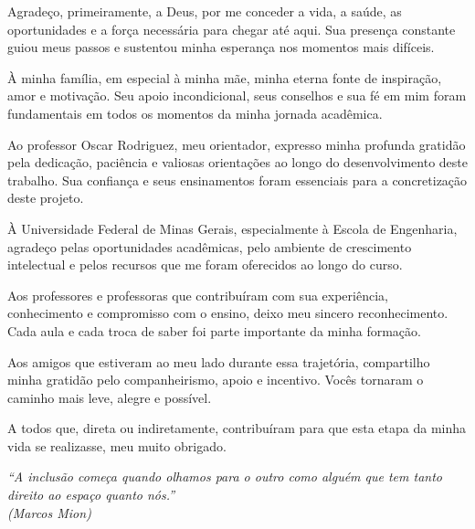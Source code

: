 \documentclass[
	12pt,				%
	openright,			%
	oneside,			%
	a4paper,			%
	english,			%
	french,				%
	spanish,			%
	brazil,				%
	]{abntex2}
\begin{document}
\begin{agradecimentos}
Agradeço, primeiramente, a Deus, por me conceder a vida, a saúde, as oportunidades e a força necessária para chegar até aqui. Sua presença constante guiou meus passos e sustentou minha esperança nos momentos mais difíceis.

À minha família, em especial à minha mãe, minha eterna fonte de inspiração, amor e motivação. Seu apoio incondicional, seus conselhos e sua fé em mim foram fundamentais em todos os momentos da minha jornada acadêmica.

Ao professor Oscar Rodriguez, meu orientador, expresso minha profunda gratidão pela dedicação, paciência e valiosas orientações ao longo do desenvolvimento deste trabalho. Sua confiança e seus ensinamentos foram essenciais para a concretização deste projeto.

À Universidade Federal de Minas Gerais, especialmente à Escola de Engenharia, agradeço pelas oportunidades acadêmicas, pelo ambiente de crescimento intelectual e pelos recursos que me foram oferecidos ao longo do curso.

Aos professores e professoras que contribuíram com sua experiência, conhecimento e compromisso com o ensino, deixo meu sincero reconhecimento. Cada aula e cada troca de saber foi parte importante da minha formação.

Aos amigos que estiveram ao meu lado durante essa trajetória, compartilho minha gratidão pelo companheirismo, apoio e incentivo. Vocês tornaram o caminho mais leve, alegre e possível.

A todos que, direta ou indiretamente, contribuíram para que esta etapa da minha vida se realizasse, meu muito obrigado.
\end{agradecimentos}

 \begin{epigrafe}
     \vspace*{\fill}
 	\begin{flushright}
  		\textit{“A inclusão começa quando olhamos para o outro como alguém que tem tanto direito ao espaço quanto nós.” \\ 
  		(Marcos Mion)}
  	\end{flushright}
  \end{epigrafe}

\end{document}
